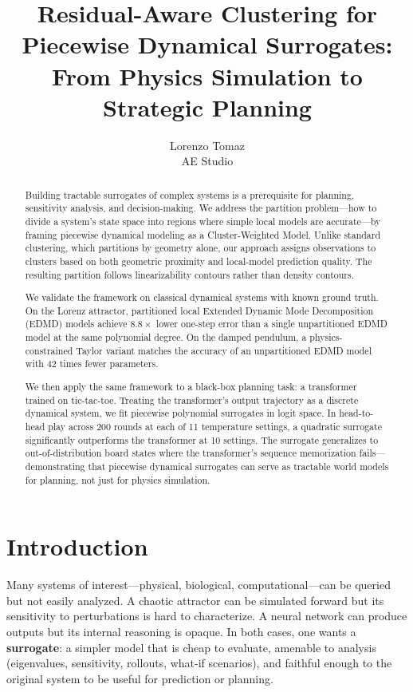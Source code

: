 \documentclass[11pt]{article}
\title{Residual-Aware Clustering for Piecewise Dynamical Surrogates:\\[0.3em]\large From Physics Simulation to Strategic Planning}
\author{Lorenzo Tomaz\\AE Studio}
\date{}
\theoremstyle{definition}
\begin{document}
\maketitle

\begin{abstract}
Building tractable surrogates of complex systems is a prerequisite for planning, sensitivity analysis, and decision-making. We address the partition problem---how to divide a system's state space into regions where simple local models are accurate---by framing piecewise dynamical modeling as a Cluster-Weighted Model. Unlike standard clustering, which partitions by geometry alone, our approach assigns observations to clusters based on both geometric proximity and local-model prediction quality. The resulting partition follows linearizability contours rather than density contours.

We validate the framework on classical dynamical systems with known ground truth. On the Lorenz attractor, partitioned local Extended Dynamic Mode Decomposition (EDMD) models achieve $8.8\times$ lower one-step error than a single unpartitioned EDMD model at the same polynomial degree. On the damped pendulum, a physics-constrained Taylor variant matches the accuracy of an unpartitioned EDMD model with 42 times fewer parameters.

We then apply the same framework to a black-box planning task: a transformer trained on tic-tac-toe. Treating the transformer's output trajectory as a discrete dynamical system, we fit piecewise polynomial surrogates in logit space. In head-to-head play across 200 rounds at each of 11 temperature settings, a quadratic surrogate significantly outperforms the transformer at 10 settings. The surrogate generalizes to out-of-distribution board states where the transformer's sequence memorization fails---demonstrating that piecewise dynamical surrogates can serve as tractable world models for planning, not just for physics simulation.
\end{abstract}

\section{Introduction}

Many systems of interest---physical, biological, computational---can be queried but not easily analyzed. A chaotic attractor can be simulated forward but its sensitivity to perturbations is hard to characterize. A neural network can produce outputs but its internal reasoning is opaque. In both cases, one wants a \textbf{surrogate}: a simpler model that is cheap to evaluate, amenable to analysis (eigenvalues, sensitivity, rollouts, what-if scenarios), and faithful enough to the original system to be useful for prediction or planning.
\end{document}
